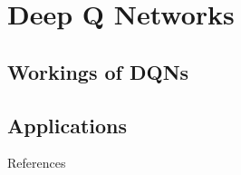 \documentclass[xcolor=dvipsnames]{beamer}
\begin{document}
\section{Deep Q Networks}
\subsection{Workings of DQNs}
\subsection{Applications}

\begin{frame}[allowframebreaks]{References}


\end{frame}
\end{document}

